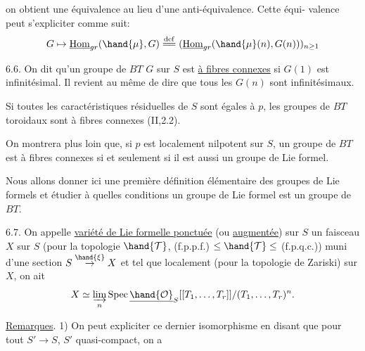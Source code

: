 
on obtient une équivalence au lieu d'une anti-équivalence. Cette équi-%
valence peut s'expliciter comme suit:
\[
G \mapsto \underline{\mathrm{Hom}}_{gr}(\hand{\mu},G) \overset{\mathrm{def}}{=\!=} (\underline{\mathrm{Hom}}_{gr}(\hand{\mu}(n),G(n)))_{n\geq 1}
\]

6.6. On dit qu'un groupe de $BT$ $G$ sur $S$ est \uline{à fibres connexes}
si $G(1)$ est infinitésimal. Il revient au même de dire que tous les
$G(n)$ sont infinitésimaux.

Si toutes les caractéristiques résiduelles de $S$ sont égales
à $p$, les groupes de $BT$ toroidaux sont à fibres connexes (II,2.2).

On montrera plus loin que, si $p$ est localement nilpotent sur
$S$, un groupe de $BT$ est à fibres connexes si et seulement si il est
aussi un groupe de Lie formel.

Nous allons donner ici une première définition élémentaire des
groupes de Lie formels et étudier à quelles conditions un groupe de Lie
formel est un groupe de $BT$.

6.7. On appelle \uline{variété de Lie formelle ponctuée} (ou \uline{augmentée}) sur
$S$ un faisceau $X$ sur $S$ (pour la topologie $\hand{\mathcal{T}}$, (f.p.p.f.) $\leq \hand{\mathcal{T}} \leq$ (f.p.q.c.))
muni d'une section $S \overset{\hand{\xi}}{\to} X$ et tel que localement (pour la topologie de
Zariski) sur $X$, on ait
\[
X \simeq \varinjlim_{n} \operatorname{Spec} \underline{\hand{\mathcal{O}}}_S[[T_1,\ldots,T_r]]/(T_1,\ldots,T_r)^n .
\]

\uline{Remarques}. 1) On peut expliciter ce dernier isomorphisme en disant
que pour tout $S' \to S$, $S'$ quasi-compact, on a

